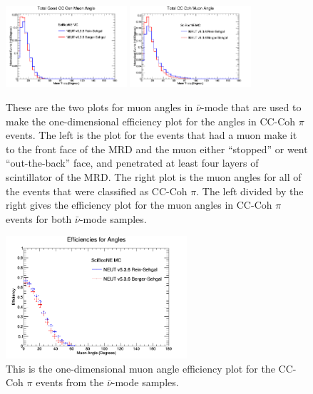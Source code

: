 \documentclass[11pt]{article}
\begin{document}
\begin{figure}[H]
\centering
\includegraphics[width=0.4\textwidth]{ANMCombinedPlotsImages/11-ANMCombinedPlots.png}
\includegraphics[width=0.4\textwidth]{ANMCombinedPlotsImages/13-ANMCombinedPlots.png}
\caption{These are the two plots for muon angles in $\bar{\nu}$-mode that are used to make the one-dimensional efficiency plot for the angles in CC-Coh $\pi$ events. The left is the plot for the events that had a muon make it to the front face of the MRD and the muon either ``stopped'' or went ``out-the-back'' face, and penetrated at least four layers of scintillator of the MRD. The right plot is the muon angles for all of the events that were classified as CC-Coh $\pi$. The left divided by the right gives the efficiency plot for the muon angles in CC-Coh $\pi$ events for both $\bar{\nu}$-mode samples.}
\label{fig:app:ANMCCCohMuonAng}
\end{figure}

\begin{figure}[H]
\centering
\includegraphics[width=0.6\textwidth]{ANMCombinedPlotsImages/17-ANMCombinedPlots.png}
\caption{This is the one-dimensional muon angle efficiency plot for the CC-Coh $\pi$ events from the $\bar{\nu}$-mode samples.}
\label{fig:app:ANMCCCohAng1DEff}
\end{figure}
\end{document}
